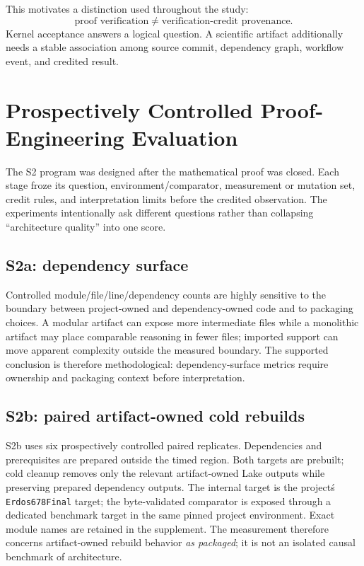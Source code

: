 \documentclass[sigplan,10pt,anonymous,review]{acmart}
\newcommand{\code}[1]{\texttt{#1}}
\begin{document}
This motivates a distinction used throughout the study:
\[
  \text{proof verification}\neq\text{verification-credit provenance}.
\]
Kernel acceptance answers a logical question. A scientific artifact additionally needs a stable association among source commit, dependency graph, workflow event, and credited result.

\section{Prospectively Controlled Proof-Engineering Evaluation}
The S2 program was designed after the mathematical proof was closed. Each stage froze its question, environment/comparator, measurement or mutation set, credit rules, and interpretation limits before the credited observation. The experiments intentionally ask different questions rather than collapsing ``architecture quality'' into one score.

\subsection{S2a: dependency surface}
Controlled module/file/line/dependency counts are highly sensitive to the boundary between project-owned and dependency-owned code and to packaging choices. A modular artifact can expose more intermediate files while a monolithic artifact may place comparable reasoning in fewer files; imported support can move apparent complexity outside the measured boundary. The supported conclusion is therefore methodological: dependency-surface metrics require ownership and packaging context before interpretation.

\subsection{S2b: paired artifact-owned cold rebuilds}
S2b uses six prospectively controlled paired replicates. Dependencies and prerequisites are prepared outside the timed region. Both targets are prebuilt; cold cleanup removes only the relevant artifact-owned Lake outputs while preserving prepared dependency outputs. The internal target is the project\'s \code{Erdos678Final} target; the byte-validated comparator is exposed through a dedicated benchmark target in the same pinned project environment. Exact module names are retained in the supplement. The measurement therefore concerns artifact-owned rebuild behavior \emph{as packaged}; it is not an isolated causal benchmark of architecture.
\end{document}
